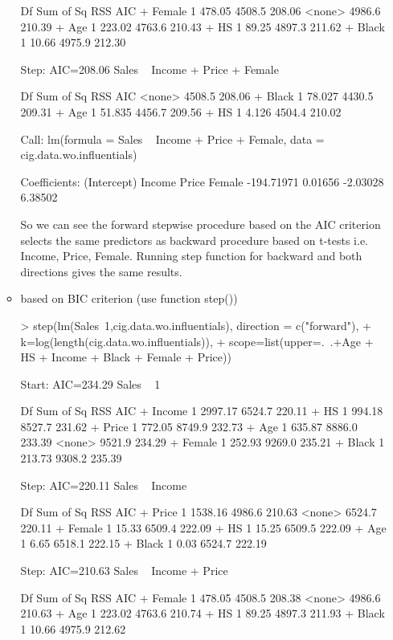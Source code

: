 \documentclass[a4paper]{article}
\begin{document}
\begin{itemize}
\begin{itemize}
\begin{Schunk}
\begin{Soutput}
         Df Sum of Sq    RSS    AIC
+ Female  1    478.05 4508.5 208.06
<none>                4986.6 210.39
+ Age     1    223.02 4763.6 210.43
+ HS      1     89.25 4897.3 211.62
+ Black   1     10.66 4975.9 212.30

Step:  AIC=208.06
Sales ~ Income + Price + Female

        Df Sum of Sq    RSS    AIC
<none>               4508.5 208.06
+ Black  1    78.027 4430.5 209.31
+ Age    1    51.835 4456.7 209.56
+ HS     1     4.126 4504.4 210.02

Call:
lm(formula = Sales ~ Income + Price + Female, data = cig.data.wo.influentials)

Coefficients:
(Intercept)       Income        Price       Female  
 -194.71971      0.01656     -2.03028      6.38502  
\end{Soutput}
\end{Schunk}
So we can see the forward stepwise procedure based on the AIC criterion selects
the same predictors as backward procedure based on t-tests i.e. Income, Price,
Female.
Running step function for backward and both directions gives the same results.
\item based on BIC criterion (use function step())
\begin{Schunk}
\begin{Sinput}
> step(lm(Sales~1,cig.data.wo.influentials), direction = c("forward"), 
+ 		k=log(length(cig.data.wo.influentials)), 
+ 		scope=list(upper=.~.+Age + HS + Income + Black + Female + Price))
\end{Sinput}
\begin{Soutput}
Start:  AIC=234.29
Sales ~ 1

         Df Sum of Sq    RSS    AIC
+ Income  1   2997.17 6524.7 220.11
+ HS      1    994.18 8527.7 231.62
+ Price   1    772.05 8749.9 232.73
+ Age     1    635.87 8886.0 233.39
<none>                9521.9 234.29
+ Female  1    252.93 9269.0 235.21
+ Black   1    213.73 9308.2 235.39

Step:  AIC=220.11
Sales ~ Income

         Df Sum of Sq    RSS    AIC
+ Price   1   1538.16 4986.6 210.63
<none>                6524.7 220.11
+ Female  1     15.33 6509.4 222.09
+ HS      1     15.25 6509.5 222.09
+ Age     1      6.65 6518.1 222.15
+ Black   1      0.03 6524.7 222.19

Step:  AIC=210.63
Sales ~ Income + Price

         Df Sum of Sq    RSS    AIC
+ Female  1    478.05 4508.5 208.38
<none>                4986.6 210.63
+ Age     1    223.02 4763.6 210.74
+ HS      1     89.25 4897.3 211.93
+ Black   1     10.66 4975.9 212.62


\end{Soutput}
\end{Schunk}
\end{itemize}
\end{itemize}
\end{document}
